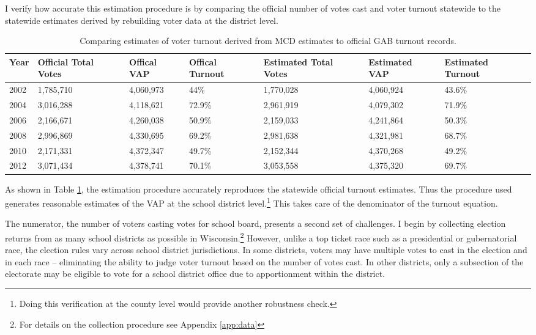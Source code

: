 I verify how accurate this estimation procedure is by comparing the official number 
of votes cast and voter turnout statewide to the statewide estimates derived by 
rebuilding voter data at the district level. 

\begin{table}[ht]
\centering
{\footnotesize
\begin{tabular}{p{.55in}p{.55in}p{.55in}p{.55in}p{.55in}p{.55in}p{.55in}}
  \hline
Year & Official Total Votes & Offical VAP & Offical Turnout & Estimated Total Votes & Estimated VAP & Estimated Turnout \\ 
  \hline
2002 & 1,785,710 & 4,060,973 & 44\% & 1,770,028 & 4,060,924 & 43.6\% \\ 
  2004 & 3,016,288 & 4,118,621 & 72.9\% & 2,961,919 & 4,079,302 & 71.9\% \\ 
  2006 & 2,166,671 & 4,260,038 & 50.9\% & 2,159,033 & 4,241,864 & 50.3\% \\ 
  2008 & 2,996,869 & 4,330,695 & 69.2\% & 2,981,638 & 4,321,981 & 68.7\% \\ 
  2010 & 2,171,331 & 4,372,347 & 49.7\% & 2,152,344 & 4,370,268 & 49.2\% \\ 
  2012 & 3,071,434 & 4,378,741 & 70.1\% & 3,053,558 & 4,375,320 & 69.7\% \\ 
   \hline
\end{tabular}
}
\caption{Comparing estimates of voter turnout derived from MCD estimates to official GAB turnout records.} 
\label{tab:turnoutEst}
\end{table}


As shown in Table \ref{tab:turnoutEst}, the estimation procedure accurately 
reproduces the statewide official turnout estimates. Thus the procedure used generates 
reasonable estimates of the VAP at the school district level.\footnote{Doing this 
verification at the county level would provide another robustness check.} This 
takes care of the denominator of the turnout equation. 

The numerator, the number of voters casting votes for school board, presents a 
second set of challenges. I begin by collecting election returns from as many 
school districts as possible in Wisconsin.\footnote{For details on the collection 
procedure see Appendix \ref{app:data}} However, unlike a top ticket race such as 
a presidential or gubernatorial race, the election rules vary across school district 
jurisdictions. In some districts, voters may have multiple votes to cast in the election 
and in each race -- eliminating the ability to judge voter turnout based on the 
number of votes cast. In other districts, only a subsection of the electorate may 
be eligible to vote for a school district office due to apportionment within 
the district. 

